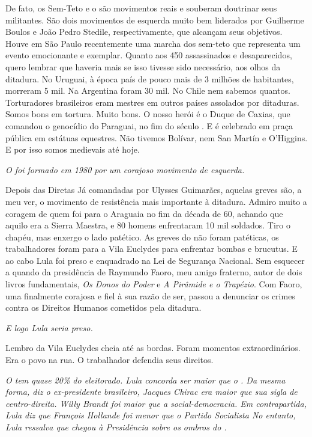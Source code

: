 \normalfont 
De fato, os Sem-Teto e o  são movimentos reais e
souberam doutrinar seus militantes. São dois movimentos de esquerda
muito bem liderados por Guilherme Boulos e João Pedro Stedile,
respectivamente, que alcançam seus objetivos. Houve em São Paulo
recentemente uma marcha dos sem-teto que representa um evento
emocionante e exemplar. Quanto aos 450 assassinados e desaparecidos,
quero lembrar que haveria mais se isso tivesse sido necessário, aos
olhos da ditadura. No Uruguai, à época país de pouco mais de 3 milhões
de habitantes, morreram 5 mil. Na Argentina foram 30 mil. No Chile nem
sabemos quantos. Torturadores brasileiros eram mestres em outros países
assolados por ditaduras. Somos bons em tortura. Muito bons. O nosso
herói é o Duque de Caxias, que comandou o genocídio do Paraguai, no fim
do século . E é celebrado em praça pública em estátuas equestres. Não
tivemos Bolívar, nem San Martín e O'Higgins. E por isso somos medievais
até hoje.

\itshape
O  foi formado em 1980 por um corajoso movimento de
esquerda.

\normalfont 
Depois das Diretas Já comandadas por Ulysses Guimarães,
aquelas greves são, a meu ver, o movimento de resistência mais
importante à ditadura. Admiro muito a coragem de quem foi para o
Araguaia no fim da década de 60, achando que aquilo era a Sierra
Maestra, e 80 homens enfrentaram 10 mil soldados. Tiro o chapéu, mas
enxergo o lado patético. As greves do  não foram patéticas, os
trabalhadores foram para a Vila Euclydes para enfrentar bombas e
brucutus. E ao cabo Lula foi preso e enquadrado na Lei de Segurança
Nacional. Sem esquecer a  quando da presidência de Raymundo Faoro,
meu amigo fraterno, autor de dois livros fundamentais, \emph{Os Donos}
\emph{do Poder} e \emph{A Pirâmide e o Trapézio}. Com Faoro, uma 
finalmente corajosa e fiel à sua razão de ser, passou a denunciar os
crimes contra os Direitos Humanos cometidos pela ditadura.

\itshape
E logo Lula seria preso.

\normalfont 
Lembro da Vila Euclydes cheia até as bordas. Foram
momentos extraordinários. Era o povo na rua. O trabalhador defendia seus
direitos.

\itshape
O  tem quase 20\% do eleitorado. Lula concorda ser
maior que o . Da mesma forma, diz o ex-presidente brasileiro, Jacques
Chirac era maior que sua sigla de centro-direita. Willy Brandt foi maior
que a social-democracia. Em contrapartida, Lula diz que François
Hollande foi menor que o Partido Socialista No entanto, Lula ressalva
que chegou à Presidência sobre os ombros do .


